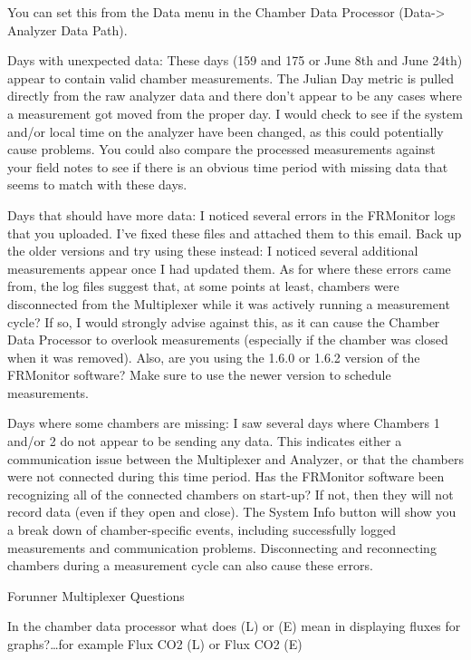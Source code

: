 \documentclass[12pt]{../SOP3_alpha}
\begin{document}
You can set this from the Data menu in the Chamber Data Processor (Data-> Analyzer Data Path).

Days with unexpected data:  These days (159 and 175 or June 8th and June 24th) appear to contain valid chamber measurements. The Julian Day metric is pulled directly from the raw analyzer data and there don't appear to be any cases where a measurement got moved from the proper day. I would check to see if the system and/or local time on the analyzer have been changed, as this could potentially cause problems. You could also compare the processed measurements against your field notes to see if there is an obvious time period with missing data that seems to match with these days.

Days that should have more data: I noticed several errors in the FRMonitor logs that you uploaded. I've fixed these files and attached them to this email. Back up the older versions and try using these instead: I noticed several additional measurements appear once I had updated them. As for where these errors came from, the log files suggest that, at some points at least, chambers were disconnected from the Multiplexer while it was actively running a measurement cycle? If so, I would strongly advise against this, as it can cause the Chamber Data Processor to overlook measurements (especially if the chamber was closed when it was removed). Also, are you using the 1.6.0 or 1.6.2 version of the FRMonitor software? Make sure to use the newer version to schedule measurements.


Days where some chambers are missing: I saw several days where Chambers 1 and/or 2 do not appear to be sending any data. This indicates either a communication issue between the Multiplexer and Analyzer, or that the chambers were not connected during this time period. Has the FRMonitor software been recognizing all of the connected chambers on start-up?  If not, then they will not record data (even if they open and close). The System Info button will show you a break down of chamber-specific events, including successfully logged measurements and communication problems. Disconnecting and reconnecting chambers during a measurement cycle can also cause these errors.





Forunner Multiplexer Questions

\NP In the chamber data processor what does (L) or (E) mean in displaying fluxes for graphs?\ldots for example Flux CO2 (L) or Flux CO2 (E) 
\end{document}
